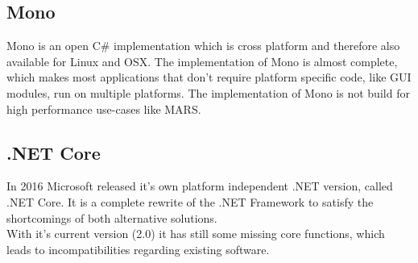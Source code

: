 \subsection{Mono}
Mono is an open C\# implementation which is cross platform and therefore also available for Linux and OSX. The implementation of Mono is almost complete, which makes most applications that don't require platform specific code, like GUI modules, run on multiple platforms. The implementation of Mono is not build for high performance use-cases like MARS.

\subsection{.NET Core}
In 2016 Microsoft released it's own platform independent .NET version, called .NET Core. It is a complete rewrite of the .NET Framework to satisfy the shortcomings of both alternative solutions.\\
With it's current version (2.0) it has still some missing core functions, which leads to incompatibilities regarding existing software.
